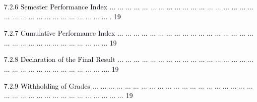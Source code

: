 \documentclass[12pt]{article}
\begin{document}
\vspace{\baselineskip}
\begin{adjustwidth}{0.5in}{0.0in}
{\fontsize{7pt}{8.4pt}\selectfont \textcolor[HTML]{00000A}{7.2.6 Semester Performance Index $ \ldots $ $ \ldots $ $ \ldots $ $ \ldots $ $ \ldots $ $ \ldots $ $ \ldots $ $ \ldots $ $ \ldots $ $ \ldots $ $ \ldots $ $ \ldots $ $ \ldots $ $ \ldots $ $ \ldots $ $ \ldots $ $ \ldots $ $ \ldots $ $ \ldots $ $ \ldots $ $ \ldots $ $ \ldots $ $ \ldots $ $ \ldots $ $ \ldots $ $ \ldots $ $ \ldots $ $ \ldots $ $ \ldots $ $ \ldots $ $ \ldots $ . 19}\par}\par

\end{adjustwidth}


\vspace{\baselineskip}
\begin{adjustwidth}{0.5in}{0.0in}
{\fontsize{7pt}{8.4pt}\selectfont \textcolor[HTML]{00000A}{7.2.7 Cumulative Performance Index $ \ldots $ $ \ldots $ $ \ldots $ $ \ldots $ $ \ldots $ $ \ldots $ $ \ldots $ $ \ldots $ $ \ldots $ $ \ldots $ $ \ldots $ $ \ldots $ $ \ldots $ $ \ldots $ $ \ldots $ $ \ldots $ $ \ldots $ $ \ldots $ $ \ldots $ $ \ldots $ $ \ldots $ $ \ldots $ $ \ldots $ $ \ldots $ $ \ldots $ $ \ldots $ $ \ldots $ $ \ldots $ $ \ldots $ $ \ldots $  19}\par}\par

\end{adjustwidth}


\vspace{\baselineskip}
\begin{adjustwidth}{0.5in}{0.0in}
{\fontsize{7pt}{8.4pt}\selectfont \textcolor[HTML]{00000A}{7.2.8 Declaration of the Final Result $ \ldots $ $ \ldots $ $ \ldots $ $ \ldots $ $ \ldots $ $ \ldots $ $ \ldots $ $ \ldots $ $ \ldots $ $ \ldots $ $ \ldots $ $ \ldots $ $ \ldots $ $ \ldots $ $ \ldots $ $ \ldots $ $ \ldots $ $ \ldots $ $ \ldots $ $ \ldots $ $ \ldots $ $ \ldots $ $ \ldots $ $ \ldots $ $ \ldots $ $ \ldots $ $ \ldots $ $ \ldots $ $ \ldots $ .... 19}\par}\par

\end{adjustwidth}


\vspace{\baselineskip}
\begin{adjustwidth}{0.5in}{0.0in}
{\fontsize{7pt}{8.4pt}\selectfont \textcolor[HTML]{00000A}{7.2.9 Withholding of Grades $ \ldots $ $ \ldots $ $ \ldots $ $ \ldots $ $ \ldots $ $ \ldots $ $ \ldots $ $ \ldots $ $ \ldots $ $ \ldots $ $ \ldots $ $ \ldots $ $ \ldots $ $ \ldots $ $ \ldots $ $ \ldots $ $ \ldots $ $ \ldots $ $ \ldots $ $ \ldots $ $ \ldots $ $ \ldots $ $ \ldots $ $ \ldots $ $ \ldots $ $ \ldots $ $ \ldots $ $ \ldots $ $ \ldots $ $ \ldots $ $ \ldots $ $ \ldots $ $ \ldots $ $ \ldots $ $ \ldots $  19}\par}\par

\end{adjustwidth}
\end{document}
